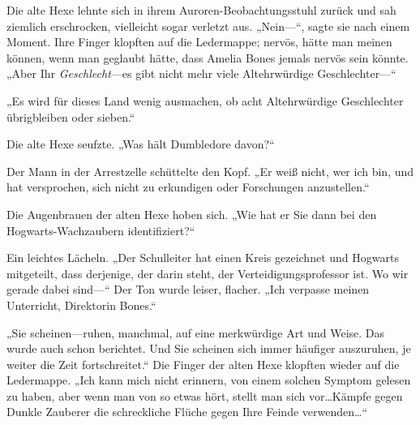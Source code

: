Die alte Hexe lehnte sich in ihrem Auroren-Beobachtungsstuhl zurück und sah ziemlich erschrocken, vielleicht sogar verletzt aus. „Nein—“, sagte sie nach einem Moment. Ihre Finger klopften auf die Ledermappe; nervös, hätte man meinen können, wenn man geglaubt hätte, dass Amelia Bones jemals nervös sein könnte. „Aber Ihr \emph{Geschlecht}—es gibt nicht mehr viele Altehrwürdige Geschlechter—“

„Es wird für dieses Land wenig ausmachen, ob acht Altehrwürdige Geschlechter übrigbleiben oder sieben.“

Die alte Hexe seufzte. „Was hält Dumbledore davon?“

Der Mann in der Arrestzelle schüttelte den Kopf. „Er weiß nicht, wer ich bin, und hat versprochen, sich nicht zu erkundigen oder Forschungen anzustellen.“

Die Augenbrauen der alten Hexe hoben sich. „Wie hat er Sie dann bei den Hogwarts-Wachzaubern identifiziert?“

Ein leichtes Lächeln. „Der Schulleiter hat einen Kreis gezeichnet und Hogwarts mitgeteilt, dass derjenige, der darin steht, der Verteidigungsprofessor ist. Wo wir gerade dabei sind—“ Der Ton wurde leiser, flacher. „Ich verpasse meinen Unterricht, Direktorin Bones.“

„Sie scheinen—ruhen, manchmal, auf eine merkwürdige Art und Weise. Das wurde auch schon berichtet. Und Sie scheinen sich immer häufiger auszuruhen, je weiter die Zeit fortschreitet.“ Die Finger der alten Hexe klopften wieder auf die Ledermappe. „Ich kann mich nicht erinnern, von einem solchen Symptom gelesen zu haben, aber wenn man von so etwas hört, stellt man sich vor…Kämpfe gegen Dunkle Zauberer die schreckliche Flüche gegen Ihre Feinde verwenden…“

